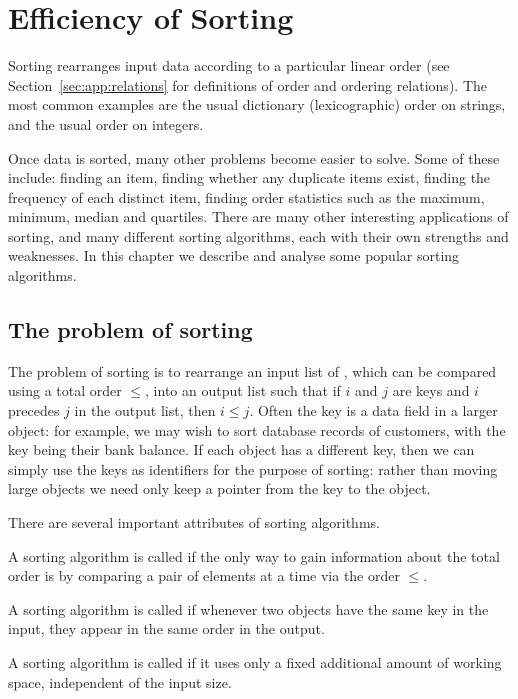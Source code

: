 \chapter{Efficiency of Sorting}
\label{CH:EFF:SORT}

Sorting rearranges input data according to a particular linear order
(see Section~\ref{sec:app:relations} for definitions of order and ordering 
relations). The most common examples are the usual dictionary (lexicographic) 
order on strings, and the usual order on integers.  

Once data is sorted, many other problems become easier to solve. Some of these 
include: finding an item, finding whether any duplicate items exist, finding the 
frequency of each distinct item, finding order statistics such as the maximum, 
minimum, median and quartiles. There are many other interesting applications of 
sorting, and many different sorting algorithms, each with their own strengths 
and weaknesses. In this chapter we describe and analyse some popular sorting 
algorithms.


\section{The problem of sorting}

The problem of sorting is to rearrange an input list of , which 
can be compared using a total order $\leq$, into an output list such that if $i$
and $j$ are keys and $i$ precedes $j$ in the output list, then $i\leq j$.
Often the key is a data field in a larger object: for example, we may wish to 
sort database records of customers, with the key being their bank balance. 
If each object has a different key, then we can simply use the keys as identifiers
for the purpose of sorting: rather than moving large objects we need only keep 
a pointer from the key to the object. 

There are several important attributes of sorting algorithms.
\begin{Definition} 
A sorting algorithm is called  if
the only way to gain information about the total order is by comparing a pair 
of elements at a time via the order $\leq$. 

A sorting algorithm is called  if whenever 
two objects have the same 
key in the input, they appear in the same order in the output. 

A sorting algorithm is called  if it uses only a fixed 
additional amount of working space, independent of the input size.
\end{Definition}

